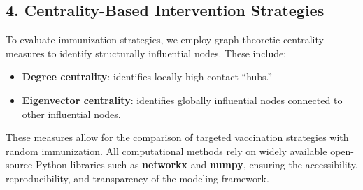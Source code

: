 \documentclass[9pt,twocolumn]{pnas-new}
\begin{document}
\subsection*{4. Centrality-Based Intervention Strategies}
To evaluate immunization strategies, we employ graph-theoretic centrality measures to identify structurally influential nodes. These include:

\begin{itemize}
    \item \textbf{Degree centrality}: identifies locally high-contact ``hubs.''
    \item \textbf{Eigenvector centrality}: identifies globally influential nodes connected to other influential nodes.
\end{itemize}

These measures allow for the comparison of targeted vaccination strategies with random immunization. All computational methods rely on widely available open-source Python libraries such as \textbf{networkx} and \textbf{numpy}, ensuring the accessibility, reproducibility, and transparency of the modeling framework.



\showacknow{} %

% 
\end{document}

